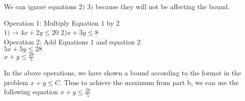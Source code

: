 \documentclass[addpoints, 11pt]{exam}
\begin{document}
\begin{questions}
\begin{parts}
    We can ignore equations $2)$ $3)$ because they will not be affecting the bound.

    Operation 1: Multiply Equation $1$ by 2 \\
    $1) \rightarrow 4x + 2y \leq 20$
    $2) x + 3y \leq 8$ \\

    Operation 2: Add Equations $1$ and equation $2$ \\
    $5x + 5y \leq 28$ \\
    $x + y \leq \frac{28}{5}$

    In the above operations, we have shown a bound according to the format in the problem $x + y \leq C$.
    Thus to achieve the maximum from part b, we can use the following equation $x + y \leq\frac{28}{5}$



  \end{parts}


\end{questions}
\end{document}
